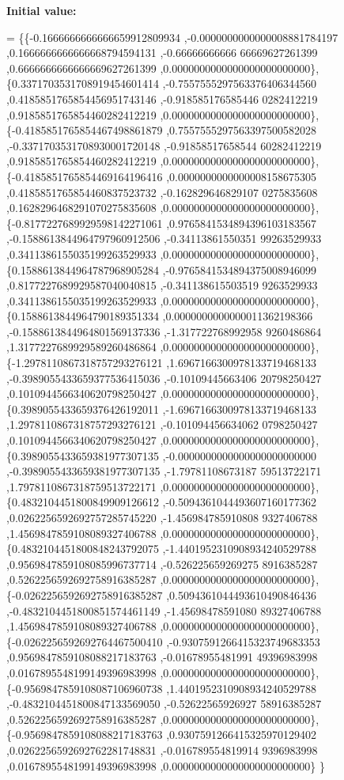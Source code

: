 {\bfseries Initial value\+:}
\begin{DoxyCode}
= \{\{-0.1666666666666659912809934 ,-0.0000000000000008881784197 ,0.1666666666666668794594131 ,-0.66666666666
      66669627261399 ,0.6666666666666669627261399 ,0.0000000000000000000000000\},
\{0.3371703531708919454601414 ,-0.7557555297563376406344560 ,0.4185851765854456951743146 ,-0.918585176585446
      0282412219 ,0.9185851765854460282412219 ,0.0000000000000000000000000\},
\{-0.4185851765854467498861879 ,0.7557555297563397500582028 ,-0.3371703531708930001720148 ,-0.91858517658544
      60282412219 ,0.9185851765854460282412219 ,0.0000000000000000000000000\},
\{-0.4185851765854469164196416 ,0.0000000000000008158675305 ,0.4185851765854460837523732 ,-0.162829646829107
      0275835608 ,0.1628296468291070275835608 ,0.0000000000000000000000000\},
\{-0.8177227689929598142271061 ,0.9765841534894396103183567 ,-0.1588613844964797960912506 ,-0.34113861550351
      99263529933 ,0.3411386155035199263529933 ,0.0000000000000000000000000\},
\{0.1588613844964787968905284 ,-0.9765841534894375008946099 ,0.8177227689929587040040815 ,-0.341138615503519
      9263529933 ,0.3411386155035199263529933 ,0.0000000000000000000000000\},
\{0.1588613844964790189351334 ,0.0000000000000011362198366 ,-0.1588613844964801569137336 ,-1.317722768992958
      9260486864 ,1.3177227689929589260486864 ,0.0000000000000000000000000\},
\{-1.2978110867318757293276121 ,1.6967166300978133719468133 ,-0.3989055433659377536415036 ,-0.10109445663406
      20798250427 ,0.1010944566340620798250427 ,0.0000000000000000000000000\},
\{0.3989055433659376426192011 ,-1.6967166300978133719468133 ,1.2978110867318757293276121 ,-0.101094456634062
      0798250427 ,0.1010944566340620798250427 ,0.0000000000000000000000000\},
\{0.3989055433659381977307135 ,-0.0000000000000000000000000 ,-0.3989055433659381977307135 ,-1.79781108673187
      59513722171 ,1.7978110867318759513722171 ,0.0000000000000000000000000\},
\{0.4832104451800849909126612 ,-0.5094361044493607160177362 ,0.0262256592692757285745220 ,-1.456984785910808
      9327406788 ,1.4569847859108089327406788 ,0.0000000000000000000000000\},
\{0.4832104451800848243792075 ,-1.4401952310908934240529788 ,0.9569847859108085996737714 ,-0.526225659269275
      8916385287 ,0.5262256592692758916385287 ,0.0000000000000000000000000\},
\{-0.0262256592692758916385287 ,0.5094361044493610490846436 ,-0.4832104451800851574461149 ,-1.45698478591080
      89327406788 ,1.4569847859108089327406788 ,0.0000000000000000000000000\},
\{-0.0262256592692764467500410 ,-0.9307591266415323749683353 ,0.9569847859108088217183763 ,-0.01678955481991
      49396983998 ,0.0167895548199149396983998 ,0.0000000000000000000000000\},
\{-0.9569847859108087106960738 ,1.4401952310908934240529788 ,-0.4832104451800847133569050 ,-0.52622565926927
      58916385287 ,0.5262256592692758916385287 ,0.0000000000000000000000000\},
\{-0.9569847859108088217183763 ,0.9307591266415325970129402 ,0.0262256592692762281748831 ,-0.016789554819914
      9396983998 ,0.0167895548199149396983998 ,0.0000000000000000000000000\}
\}
\end{DoxyCode}
